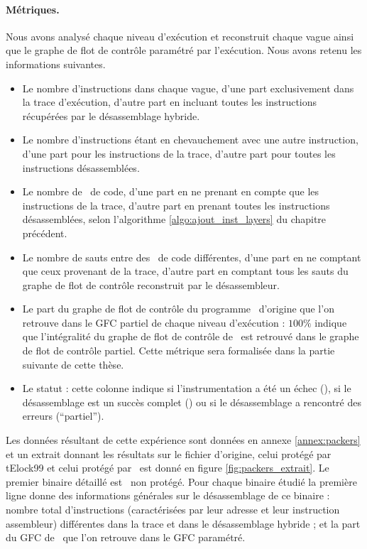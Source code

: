 \paragraph{Métriques.}
Nous avons analysé chaque niveau d'exécution et reconstruit chaque vague ainsi que le graphe de flot de contrôle paramétré par l'exécution. Nous avons retenu les informations suivantes.
\begin{itemize}
 \item Le nombre d'instructions dans chaque vague, d'une part exclusivement dans la trace d'exécution, d'autre part en incluant toutes les instructions récupérées par le désassemblage hybride.
 \item Le nombre d'instructions étant en chevauchement avec une autre instruction, d'une part pour les instructions de la trace, d'autre part pour toutes les instructions désassemblées.
 \item Le nombre de \layers\ de code, d'une part en ne prenant en compte que les instructions de la trace, d'autre part en prenant toutes les instructions désassemblées, selon l'algorithme \ref{algo:ajout_inst_layers} du chapitre précédent.
 \item Le nombre de sauts entre des \layers\ de code différentes, d'une part en ne comptant que ceux provenant de la trace, d'autre part en comptant tous les sauts du graphe de flot de contrôle reconstruit par le désassembleur.
 \item Le part du graphe de flot de contrôle du programme \hostname\ d'origine que l'on retrouve dans le GFC partiel de chaque niveau d'exécution : $100\%$ indique que l'intégralité du graphe de flot de contrôle de \hostname\ est retrouvé dans le graphe de flot de contrôle partiel. Cette métrique sera formalisée dans la partie suivante de cette thèse.
 \item Le statut : cette colonne indique si l'instrumentation a été un échec (\checkf), si le désassemblage est un succès complet (\checkv) ou si le désassemblage a rencontré des erreurs (``partiel'').
\end{itemize}
Les données résultant de cette expérience sont données en annexe \ref{annex:packers} et un extrait donnant les résultats sur le fichier d'origine, celui protégé par tElock99 et celui protégé par \upx\ est donné en figure \ref{fig:packers_extrait}.
Le premier binaire détaillé est \hostname\ non protégé. Pour chaque binaire étudié la première ligne donne des informations générales sur le désassemblage de ce binaire : nombre total d'instructions (caractérisées par leur adresse et leur instruction assembleur) différentes dans la trace et dans le désassemblage hybride ; et la part du GFC de \hostname\ que l'on retrouve dans le GFC paramétré.

